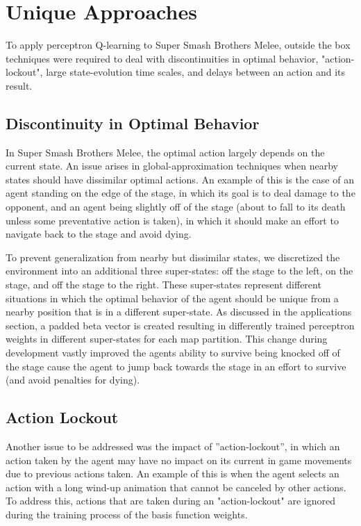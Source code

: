 \section{Unique Approaches}

To apply perceptron Q-learning to Super Smash Brothers Melee, outside the box techniques were required to deal with discontinuities in optimal behavior, "action-lockout", large state-evolution time scales, and delays between an action and its result.

\subsection{Discontinuity in Optimal Behavior}
In Super Smash Brothers Melee, the optimal action largely depends on the current state. An issue arises in global-approximation techniques when nearby states should have dissimilar optimal actions. An example of this is the case of an agent standing on the edge of the stage, in which its goal is to deal damage to the opponent, and an agent being slightly off of the stage (about to fall to its death unless some preventative action is taken), in which it should make an effort to navigate back to the stage and avoid dying. 

To prevent generalization from nearby but dissimilar states, we discretized the environment into an additional three super-states: off the stage to the left, on the stage, and off the stage to the right. These super-states represent different situations in which the optimal behavior of the agent should be unique from a nearby position that is in a different super-state. As discussed in the applications section, a padded beta vector is created resulting in differently trained perceptron weights in different super-states for each map partition. This change during development vastly improved the agents ability to survive being knocked off of the stage cause the agent to jump back towards the stage in an effort to survive (and avoid penalties for dying). 

\subsection{Action Lockout}
Another issue to be addressed was the impact of ”action-lockout”, in which an action taken by the agent may have no impact on its current in game movements due to previous actions taken. An example of this is when the agent selects an action with a long wind-up animation that cannot be canceled by other actions. To address this, actions that are taken during an "action-lockout" are ignored during the training process of the basis function weights. 

